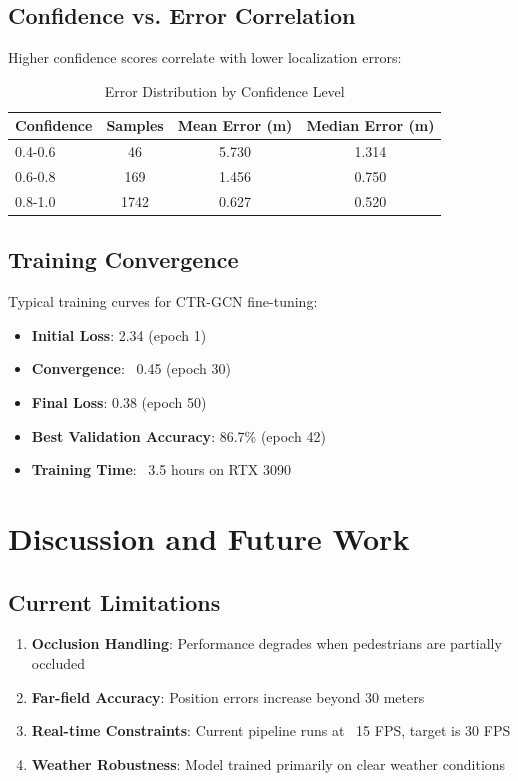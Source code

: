 \documentclass[11pt,a4paper]{article}
\begin{document}
\subsection{Confidence vs. Error Correlation}

Higher confidence scores correlate with lower localization errors:

\begin{table}[h]
\centering
\caption{Error Distribution by Confidence Level}
\begin{tabular}{lccc}
\toprule
\textbf{Confidence} & \textbf{Samples} & \textbf{Mean Error (m)} & \textbf{Median Error (m)} \\
\midrule
0.4-0.6 & 46 & 5.730 & 1.314 \\
0.6-0.8 & 169 & 1.456 & 0.750 \\
0.8-1.0 & 1742 & 0.627 & 0.520 \\
\bottomrule
\end{tabular}
\end{table}

\subsection{Training Convergence}

Typical training curves for CTR-GCN fine-tuning:

\begin{itemize}
    \item \textbf{Initial Loss}: 2.34 (epoch 1)
    \item \textbf{Convergence}: ~0.45 (epoch 30)
    \item \textbf{Final Loss}: 0.38 (epoch 50)
    \item \textbf{Best Validation Accuracy}: 86.7\% (epoch 42)
    \item \textbf{Training Time}: ~3.5 hours on RTX 3090
\end{itemize}

\section{Discussion and Future Work}

\subsection{Current Limitations}

\begin{enumerate}
    \item \textbf{Occlusion Handling}: Performance degrades when pedestrians are partially occluded
    \item \textbf{Far-field Accuracy}: Position errors increase beyond 30 meters
    \item \textbf{Real-time Constraints}: Current pipeline runs at ~15 FPS, target is 30 FPS
    \item \textbf{Weather Robustness}: Model trained primarily on clear weather conditions
\end{enumerate}
\end{document}
